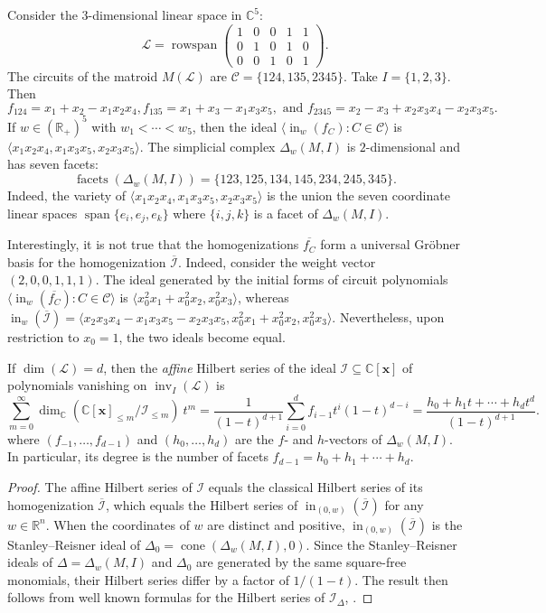 \documentclass[ALCO,ThmDefs,Unicode,epreuves]{cedram}
\newcommand{\R}{\mathbb{R}}
\newcommand{\Cbb}{\mathbb{C}}
\newcommand{\I}{\mathcal{I}}
\newcommand{\cL}{\mathcal{L}}
\newcommand{\CC}{\mathcal{C}}
\newcommand{\x}{\mathbf{x}}
\newcommand{\ol}{\overline}
\DeclareMathOperator{\In}{in}
\DeclareMathOperator{\inv}{inv}
\DeclareMathOperator{\spanrm}{span}
\DeclareMathOperator{\cone}{cone}
\DeclareMathOperator{\facets}{facets}
\DeclareMathOperator{\rowspan}{rowspan}
\begin{document}
\begin{exam} \label{ex:NonGen} Consider the $3$-dimensional linear space in $\Cbb^5$: 
\[ \cL  =  \rowspan \begin{pmatrix} 
1&0&0&1&1\\
0&1&0&1&0\\
0&0&1&0&1
\end{pmatrix}.\]
The circuits of the matroid $M(\cL)$ are $\CC = \{124, 135, 2345\}$. Take $I = \{1,2,3\}$. Then 
\[ f_{124} = x_1 + x_2 - x_1x_2x_4, f_{135} =x_1+x_3 -x_1x_3x_5, \text{ and } f_{2345} = x_2 - x_3+x_2x_3x_4 - x_2x_3x_5. \]
If $w\in (\R_+)^5$ with $w_1<\cdots < w_5$, then the ideal $\langle \In_w(f_C): C\in \CC \rangle$ is 
$\langle x_1x_2x_4, x_1x_3x_5, x_2x_3x_5 \rangle$.
The simplicial complex $\Delta_w(M,I)$ is $2$-dimensional and has seven facets:
\[ \facets(\Delta_w(M,I))  =  \{ 123, 125, 134, 145, 234, 245, 345 \}.\]
Indeed, the variety of $\langle x_1x_2x_4, x_1x_3x_5, x_2x_3x_5 \rangle$ is the union the seven coordinate linear spaces 
$\spanrm \{e_i, e_j, e_k\}$ where $\{i,j,k\}$ is a facet of $\Delta_w(M,I)$. 

Interestingly, it is not true that the homogenizations $\ol{f_C}$ form a universal Gr\"obner basis for the homogenization $\ol{\I}$. 
Indeed, consider the weight vector $(2,0,0,1,1,1)$. The ideal generated by the initial forms of circuit polynomials 
$\langle \In_{w}(\ol{f_C}):C\in \CC \rangle$ is $\langle
x_0^2x_1+x_0^2x_2,x_0^2x_3\rangle$, whereas 
$\In_{w}(\ol{\I})=\langle x_2x_3x_4-x_1x_3x_5-x_2x_3x_5,x_0^2x_1+x_0^2x_2,x_0^2x_3 \rangle$. 
Nevertheless, upon restriction to $x_0=1$, the two ideals become equal. 
\end{exam}

\begin{coro}\label{cor:degreeFacets}
If $\dim(\cL) = d$, then the \emph{affine} Hilbert series of the ideal $\I \subseteq \Cbb[\x]$ of polynomials vanishing on $\inv_I(\cL)$
 is
\[
\sum_{m=0}^{\infty} \dim_{\Cbb}(\Cbb[\x]_{\leq m}/\I_{\leq m}) \ t^m 
= \frac{1}{(1-t)^{d+1}} \sum_{i=0}^{d}f_{i-1} t^i(1-t)^{d-i}
= \frac{ h_0 + h_1 t + \cdots + h_dt^d}{(1-t)^{d+1}}.
\]
where $(f_{-1}, \ldots , f_{d-1})$ and $(h_0,\ldots , h_d)$ are the $f$- and $h$-vectors of $\Delta_w(M,I)$. 
In particular, its degree is the number of facets $f_{d-1} = h_0 + h_1 + \cdots + h_d$. 
\end{coro} 
\begin{proof}
The affine Hilbert series of $\I$ equals the classical Hilbert series of its homogenization $\ol{\I}$, 
which equals the Hilbert series of $\In_{(0,w)}(\ol{\I})$ for any $w\in \R^{n}$. 
When the coordinates of $w$ are distinct and positive, $\In_{(0,w)}(\ol{\I})$ is the Stanley--Reisner ideal of 
$\Delta_0 = \cone (\Delta_w(M,I),0)$. Since the Stanley--Reisner ideals of $\Delta = \Delta_w(M,I)$ and $\Delta_0$ 
are generated by the same square-free monomials, their Hilbert series differ by a factor of $1/(1-t)$. 
The result then follows from well known formulas for the Hilbert series of $\I_\Delta$, \cite[Ch.~1]{CCABook}. 
\end{proof}
\end{document}
